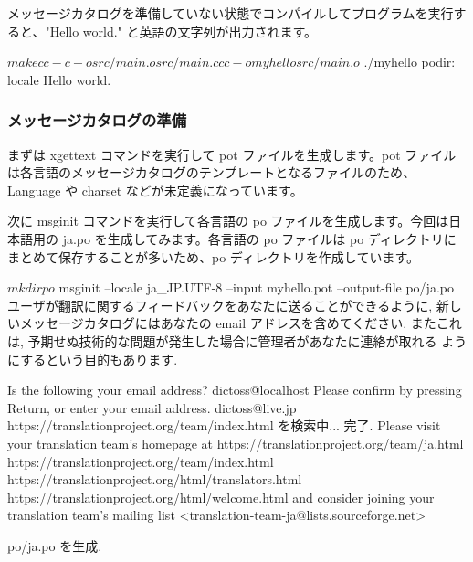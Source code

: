 \documentclass[mingoth,a4paper]{jsarticle}
\begin{document}
メッセージカタログを準備していない状態でコンパイルしてプログラムを実行すると、"Hello world." と英語の文字列が出力されます。

\begin{commandline}
$ make
cc -c -o src/main.o src/main.c
cc -o myhello  src/main.o

$ ./myhello
podir: locale
Hello world.
\end{commandline}


\subsubsection{メッセージカタログの準備}

まずは xgettext コマンドを実行して pot ファイルを生成します。pot ファイルは各言語のメッセージカタログのテンプレートとなるファイルのため、Language や charset などが未定義になっています。


次に msginit コマンドを実行して各言語の po ファイルを生成します。今回は日本語用の ja.po を生成してみます。各言語の po ファイルは po ディレクトリにまとめて保存することが多いため、po ディレクトリを作成しています。

\begin{commandline}
$ mkdir po
$ msginit --locale ja_JP.UTF-8 --input myhello.pot --output-file po/ja.po
ユーザが翻訳に関するフィードバックをあなたに送ることができるように,
新しいメッセージカタログにはあなたの email アドレスを含めてください.
またこれは, 予期せぬ技術的な問題が発生した場合に管理者があなたに連絡が取れる
ようにするという目的もあります.

Is the following your email address?
  dictoss@localhost
Please confirm by pressing Return, or enter your email address.
dictoss@live.jp
https://translationproject.org/team/index.html を検索中... 完了.
Please visit your translation team's homepage at
  https://translationproject.org/team/ja.html
  https://translationproject.org/team/index.html
  https://translationproject.org/html/translators.html
  https://translationproject.org/html/welcome.html
and consider joining your translation team's mailing list
  <translation-team-ja@lists.sourceforge.net>

po/ja.po を生成.
\end{commandline}
\end{document}
